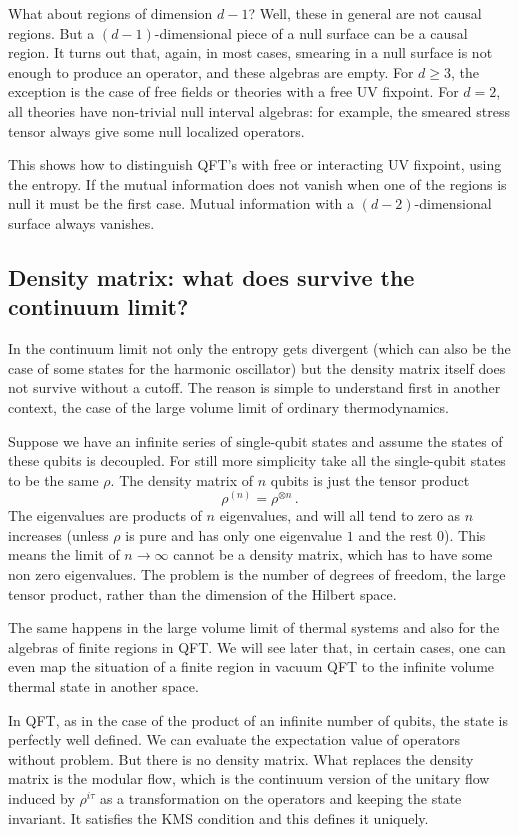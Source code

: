 \documentclass[11pt]{article}
\numberwithin{equation}{section}
\newcommand{\be}{\begin{equation}}
\newcommand{\ee}{\end{equation}}
\begin{document}
What about regions of dimension $d-1$? Well, these in general are not causal regions. But a $(d-1)$-dimensional piece of a null surface can be a causal region. It turns out that, again, in most cases, smearing in a null surface is not enough to produce an operator, and these algebras are empty. For $d\ge 3$, the exception is the case of free fields or theories with a free UV fixpoint. For $d=2$, all theories have non-trivial null interval algebras: for example, the smeared stress tensor always give some null localized operators.  

This shows how to distinguish QFT's with free or interacting UV fixpoint, using the entropy. If the mutual information does not vanish when one of the regions is null it must be the first case. Mutual information with a $(d-2)$-dimensional surface always vanishes. 

\subsection{Density matrix: what does survive the continuum limit?}
\label{density}
In the continuum limit not only the entropy gets divergent (which can also be the case of some states for the harmonic oscillator) but the density matrix itself does not survive without a cutoff. The reason is simple to understand first in another context, the case of the large volume limit of ordinary thermodynamics. 

Suppose we have an infinite series of single-qubit states and assume the states of these qubits is decoupled. For still more simplicity take all the single-qubit states to be the same $\rho$. The density matrix of $n$ qubits is just the tensor product
\be
\rho^{(n)}=\rho^{\otimes n}\,. 
\ee
The eigenvalues are products of $n$ eigenvalues, and will all tend to zero as $n$ increases (unless $\rho$ is pure and has only one eigenvalue $1$ and the rest $0$). This means the limit of $n\rightarrow \infty$ cannot be a density matrix, which has to have some non zero eigenvalues. The problem is the number of degrees of freedom, the large tensor product, rather than the dimension of the Hilbert space. 

The same happens in the large volume limit of thermal systems and also for the algebras of finite regions in QFT. We will see later that, in certain cases, one can even map the situation of a finite region in vacuum QFT to the infinite volume thermal state in another space. 

In QFT, as in the case of the product of an infinite number of qubits, the state is perfectly well defined. We can evaluate the expectation value of operators without problem. But there is no density matrix.     
What replaces the density matrix is the modular flow, which is the continuum version of the unitary flow induced by $\rho^{i\tau}$ as a transformation on the operators and keeping the state invariant. It satisfies the KMS condition and this defines it uniquely.  
\end{document}
